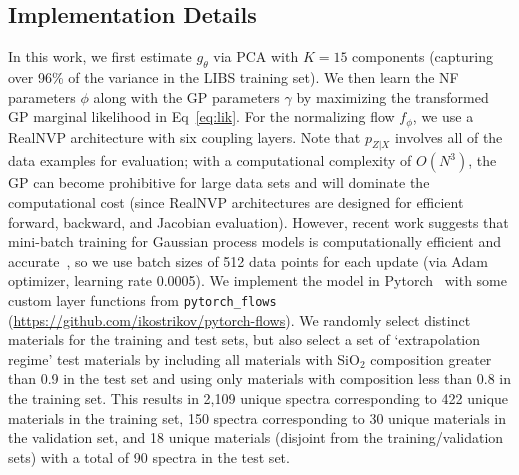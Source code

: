 \documentclass[letterpaper]{article} %
\begin{document}
\subsection{Implementation Details}
In this work, we first estimate $g_\theta$ via PCA with $K = 15$ components (capturing over 96\% of the variance in the LIBS training set).
We then learn the NF parameters $\phi$ along with the GP parameters $\gamma$ by maximizing the transformed GP marginal likelihood in Eq~\ref{eq:lik}.
For the normalizing flow $f_\phi$, we use a RealNVP architecture with six coupling layers.
Note that $p_{Z|X}$ involves all of the data examples for evaluation; with a computational complexity of $O(N^3)$, the GP can become prohibitive for large data sets and will dominate the computational cost (since RealNVP architectures are designed for efficient forward, backward, and Jacobian evaluation).
However, recent work suggests that mini-batch training for Gaussian process models is computationally efficient and accurate~\cite{chen2020stochastic}, so we use batch sizes of 512 data points for each update (via Adam optimizer, learning rate 0.0005).
We implement the model in Pytorch~\cite{paszke2019pytorch} with some custom layer functions from \texttt{pytorch\_flows} (\url{https://github.com/ikostrikov/pytorch-flows}).
We randomly select distinct materials for the training and test sets, but also select a set of `extrapolation regime' test materials by including all materials with SiO$_2$ composition greater than 0.9 in the test set and using only materials with composition less than 0.8 in the training set.
This results in 2,109 unique spectra corresponding to 422 unique materials in the training set, 150 spectra corresponding to 30 unique materials in the validation set, and 18 unique materials (disjoint from the training/validation sets) with a total of 90 spectra in the test set.
\end{document}
